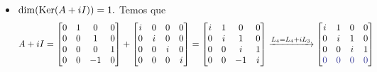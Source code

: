 \documentclass[11pt,a4paper]{article}
\begin{document}
{\begin{itemize}
    Portanto, $\mbox{posto}(A - iI) = 3,$ e $\dim(\Ker(A - iI)) = 1.$ Encontremos agora um autovetor que gera $\Ker(A - iI).$ Para isso, basta resolver o sistema
    \[
     \begin{bmatrix}
-i & 1 & 0& 0\\
0 &-i &1 & 0 \\
0 &0 &-i& 1 \\
0 & 0 &0& 0\end{bmatrix} \begin{bmatrix} x \\ y \\ z \\ w\end{bmatrix} = \begin{bmatrix} 0 \\ 0\\ 0 \\ 0\end{bmatrix}
     \Rightarrow (x,y,z,w) = w \cdot (i, -1, -i, 1)\]
     Portanto, $\Ker(A  - iI) = \langle (i, -1, -i, 1) \rangle.$
      \item $\dim(\operatorname{Ker}(A + iI)) = 1.$ Temos que
    \[
    A + iI = \begin{bmatrix}
0 & 1 & 0& 0\\
0 &0 &1 & 0 \\
0 &0 &0& 1 \\
0 & 0 & -1&0
\end{bmatrix} + \begin{bmatrix}
i & 0 & 0& 0\\
0 &i &0 & 0 \\
0 &0 &i& 0 \\
0 & 0 & 0&i
\end{bmatrix} = \begin{bmatrix}
i & 1 & 0& 0\\
0 &i &1 & 0 \\
0 &0 &i& 1 \\
0 & 0 & -1&i
\end{bmatrix} \xrightarrow[]{L_4 = L_4 +iL_3} \begin{bmatrix}
i & 1 & 0& 0\\
0 &i &1 & 0 \\
0 &0 &i& 1 \\
\textcolor{Blue}{0} & \textcolor{Blue}{0} & \textcolor{Blue}{0}& \textcolor{Blue}{0}
\end{bmatrix}
    \]
    

\end{itemize}}
\end{document}
